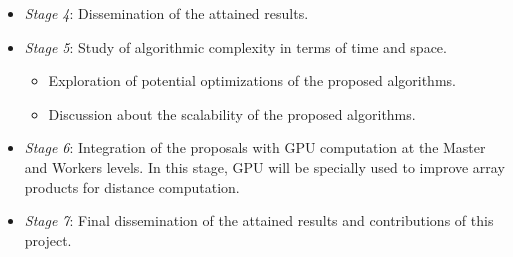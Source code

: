 \documentclass[10pt]{article}
\begin{document}
\begin{itemize}
\begin{enumerate}
\end{enumerate}
\item \textit{Stage 4}: %
    Dissemination of the attained results.
\item \textit{Stage 5}: Study of algorithmic complexity in terms of time and space.
    \begin{itemize}
        \item Exploration of potential optimizations of the proposed algorithms.
        \item Discussion about the scalability of the proposed algorithms.
    \end{itemize}
\item \textit{Stage 6}: Integration of the proposals with GPU computation at the Master and Workers levels. In this stage, GPU will be specially used to improve array products for distance computation.
\item \textit{Stage 7}: %
    Final dissemination of the attained results and contributions of this project.
\end{itemize}


\end{document}
